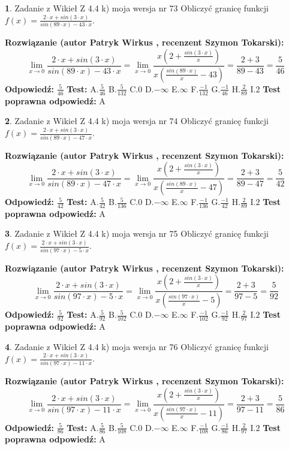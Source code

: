 \documentclass[12pt, a4paper]{article}
\theoremstyle{definition} %
\newtheorem{zad}{}
\newcommand{\zadStart}[1]{\begin{zad}#1\newline}
\newcommand{\zadStop}{\end{zad}}
\newcommand{\rozwStart}[2]{\noindent \textbf{Rozwiązanie (autor #1 , recenzent #2): }\newline}
\newcommand{\rozwStop}{\newline}
\newcommand{\odpStart}{\noindent \textbf{Odpowiedź:}\newline}
\newcommand{\odpStop}{\newline}
\newcommand{\testStart}{\noindent \textbf{Test:}\newline}
\newcommand{\testStop}{\newline}
\newcommand{\kluczStart}{\noindent \textbf{Test poprawna odpowiedź:}\newline}
\newcommand{\kluczStop}{\newline}
\begin{document}
\zadStart{Zadanie z Wikieł Z 4.4 k) moja wersja nr 73}
Obliczyć granicę funkcji $f(x)=\frac{2\cdot x +sin(3\cdot x)}{sin(89\cdot x) -43\cdot x}$.
\zadStop
\rozwStart{Patryk Wirkus}{Szymon Tokarski}
$$\lim\limits_{x\to 0}\frac{2\cdot x +sin(3\cdot x)}{sin(89\cdot x) -43\cdot x}
=\lim\limits_{x\to 0}\frac{x(2+\frac{sin(3\cdot x)}{x})}{x(\frac{sin(89\cdot x)}{x}-43)}
=\frac{2+3}{89-43} = \frac{5}{46}$$
\rozwStop
\odpStart
$\frac{5}{46}$
\odpStop
\testStart
A.$\frac{5}{46}$
B.$\frac{5}{132}$
C.$0$
D.$-\infty$
E.$\infty$
F.$\frac{-1}{132}$
G.$\frac{-1}{46}$
H.$\frac{2}{89}$
I.$2$
\testStop
\kluczStart
A
\kluczStop



\zadStart{Zadanie z Wikieł Z 4.4 k) moja wersja nr 74}
Obliczyć granicę funkcji $f(x)=\frac{2\cdot x +sin(3\cdot x)}{sin(89\cdot x) -47\cdot x}$.
\zadStop
\rozwStart{Patryk Wirkus}{Szymon Tokarski}
$$\lim\limits_{x\to 0}\frac{2\cdot x +sin(3\cdot x)}{sin(89\cdot x) -47\cdot x}
=\lim\limits_{x\to 0}\frac{x(2+\frac{sin(3\cdot x)}{x})}{x(\frac{sin(89\cdot x)}{x}-47)}
=\frac{2+3}{89-47} = \frac{5}{42}$$
\rozwStop
\odpStart
$\frac{5}{42}$
\odpStop
\testStart
A.$\frac{5}{42}$
B.$\frac{5}{136}$
C.$0$
D.$-\infty$
E.$\infty$
F.$\frac{-1}{136}$
G.$\frac{-1}{42}$
H.$\frac{2}{89}$
I.$2$
\testStop
\kluczStart
A
\kluczStop



\zadStart{Zadanie z Wikieł Z 4.4 k) moja wersja nr 75}
Obliczyć granicę funkcji $f(x)=\frac{2\cdot x +sin(3\cdot x)}{sin(97\cdot x) -5\cdot x}$.
\zadStop
\rozwStart{Patryk Wirkus}{Szymon Tokarski}
$$\lim\limits_{x\to 0}\frac{2\cdot x +sin(3\cdot x)}{sin(97\cdot x) -5\cdot x}
=\lim\limits_{x\to 0}\frac{x(2+\frac{sin(3\cdot x)}{x})}{x(\frac{sin(97\cdot x)}{x}-5)}
=\frac{2+3}{97-5} = \frac{5}{92}$$
\rozwStop
\odpStart
$\frac{5}{92}$
\odpStop
\testStart
A.$\frac{5}{92}$
B.$\frac{5}{102}$
C.$0$
D.$-\infty$
E.$\infty$
F.$\frac{-1}{102}$
G.$\frac{-1}{92}$
H.$\frac{2}{97}$
I.$2$
\testStop
\kluczStart
A
\kluczStop



\zadStart{Zadanie z Wikieł Z 4.4 k) moja wersja nr 76}
Obliczyć granicę funkcji $f(x)=\frac{2\cdot x +sin(3\cdot x)}{sin(97\cdot x) -11\cdot x}$.
\zadStop
\rozwStart{Patryk Wirkus}{Szymon Tokarski}
$$\lim\limits_{x\to 0}\frac{2\cdot x +sin(3\cdot x)}{sin(97\cdot x) -11\cdot x}
=\lim\limits_{x\to 0}\frac{x(2+\frac{sin(3\cdot x)}{x})}{x(\frac{sin(97\cdot x)}{x}-11)}
=\frac{2+3}{97-11} = \frac{5}{86}$$
\rozwStop
\odpStart
$\frac{5}{86}$
\odpStop
\testStart
A.$\frac{5}{86}$
B.$\frac{5}{108}$
C.$0$
D.$-\infty$
E.$\infty$
F.$\frac{-1}{108}$
G.$\frac{-1}{86}$
H.$\frac{2}{97}$
I.$2$
\testStop
\kluczStart
A
\kluczStop
\end{document}
